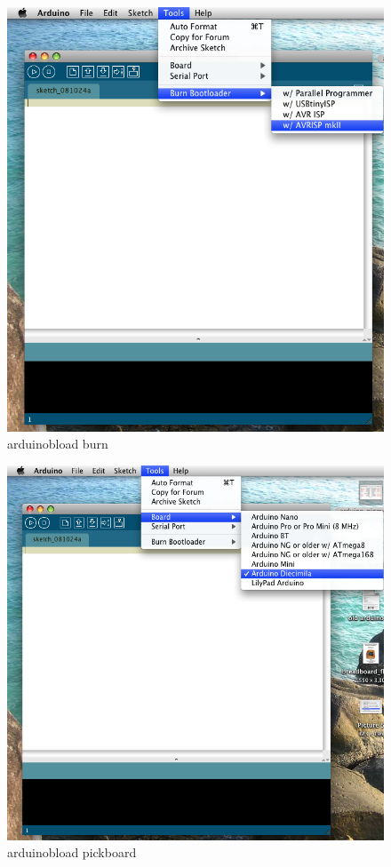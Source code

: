 \begin{figure}[!htb]
 \centering
 \includegraphics[scale=0.3]{img/arduino_breadboard/arduinobload_burn.png}
 \caption{arduinobload burn}
 \label{arduinobload burn}
\end{figure}


\begin{figure}[!htb]
 \centering
 \includegraphics[scale=0.3]{img/arduino_breadboard/arduinobload_pickboard.png}
 \caption{arduinobload pickboard}
 \label{arduinobload pickboard}
\end{figure}


